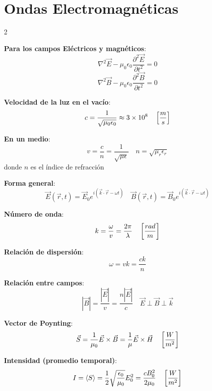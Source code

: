 \documentclass{article}
\begin{document}
\section{Ondas Electromagnéticas}
\begin{multicols}{2}



\begin{itemform}
\item \textbf{Para los campos Eléctricos y magnéticos}:
$$\nabla^2 \vec{E} - \mu_0\epsilon_0\frac{\partial^2 \vec{E}}{\partial t^2} = 0$$
$$\nabla^2 \vec{B} - \mu_0\epsilon_0\frac{\partial^2 \vec{B}}{\partial t^2} = 0$$

\item \textbf{Velocidad de la luz en el vacío}:
$$c = \frac{1}{\sqrt{\mu_0\epsilon_0}} \approx 3 \times 10^8 \quad \left[\frac{m}{s} \right]$$

\item \textbf{En un medio}:
$$v = \frac{c}{n} = \frac{1}{\sqrt{\mu\epsilon}} \quad n = \sqrt{\mu_r\epsilon_r}$$
donde $n$ es el índice de refracción
\end{itemform}



\begin{itemform}
\item \textbf{Forma general}:
$$\vec{E}(\vec{r},t) = \vec{E}_0 e^{i(\vec{k}\cdot\vec{r} - \omega t)} \quad \vec{B}(\vec{r},t) = \vec{B}_0 e^{i(\vec{k}\cdot\vec{r} - \omega t)}$$

\item \textbf{Número de onda}:
$$k = \frac{\omega}{v} = \frac{2\pi}{\lambda} \quad \left[\frac{rad}{m} \right]$$

\item \textbf{Relación de dispersión}:
$$\omega = vk = \frac{ck}{n}$$

\item \textbf{Relación entre campos}:
$$|\vec{B}| = \frac{|\vec{E}|}{v} = \frac{n|\vec{E}|}{c} \quad \vec{E} \perp \vec{B} \perp \vec{k}$$
\end{itemform}



\begin{itemform}
\item \textbf{Vector de Poynting}:
$$\vec{S} = \frac{1}{\mu_0}\vec{E} \times \vec{B} = \frac{1}{\mu}\vec{E} \times \vec{H} \quad \left[\frac{W}{m^2} \right]$$

\item \textbf{Intensidad (promedio temporal)}:
$$I = \langle S \rangle = \frac{1}{2}\sqrt{\frac{\epsilon_0}{\mu_0}}E_0^2 = \frac{cB_0^2}{2\mu_0} \quad \left[\frac{W}{m^2} \right]$$


\end{itemform}
\end{multicols}
\end{document}
